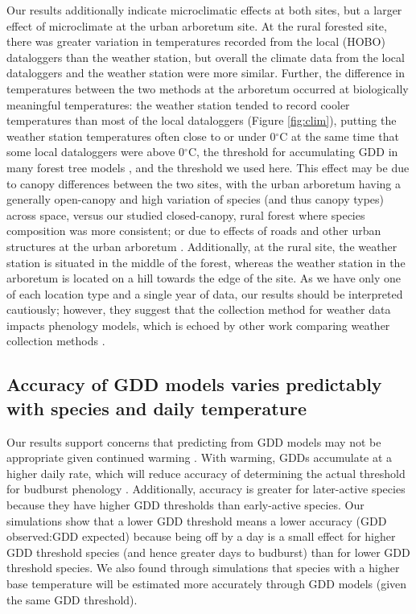 \documentclass{article}\usepackage[]{graphicx}\usepackage[]{color}
\begin{document}
Our results additionally indicate microclimatic effects at both sites, but a larger effect of microclimate at the urban arboretum site. At the rural forested site, there was greater variation in temperatures recorded from the local (HOBO) dataloggers than the weather station, but overall the climate data from the local dataloggers and the weather station were more similar. Further, the difference in temperatures between the two methods at the arboretum occurred at biologically meaningful temperatures: the weather station tended to record cooler temperatures than most of the local dataloggers (Figure \ref{fig:clim}), putting the weather station temperatures often close to or under 0$^{\circ}$C at the same time that some local dataloggers were above 0$^{\circ}$C, the threshold for accumulating GDD in many forest tree models \citep{Man2010}, and the threshold we used here. This effect may be due to canopy differences between the two sites, with the urban arboretum having a generally open-canopy and high variation of species (and thus canopy types) across space, versus our studied closed-canopy, rural forest where species composition was more consistent; or due to effects of roads and other urban structures at the urban arboretum \citep{Stabler2005,Erell2012,Dimoudi2013}. Additionally, at the rural site, the weather station is situated in the middle of the forest, whereas the weather station in the arboretum is located on a hill towards the edge of the site. As we have only one of each location type and a single year of data, our results should be interpreted cautiously; however, they suggest that the collection method for weather data impacts phenology models, which is echoed by other work comparing weather collection methods \citep[e.g.,][]{Laigle2021}.

\subsection{Accuracy of GDD models varies predictably with species and daily temperature} 
Our results support concerns that predicting from GDD models may not be appropriate given continued warming \citep{Man2010}. With warming, GDDs accumulate at a higher daily rate, which will reduce accuracy of determining the actual threshold for budburst phenology \citep{Bonhomme2000}. Additionally, accuracy is greater for later-active species because they have higher GDD thresholds than early-active species. Our simulations show that a lower GDD threshold means a lower accuracy (GDD observed:GDD expected) because being off by a day is a small effect for higher GDD threshold species (and hence greater days to budburst) than for lower GDD threshold species. We also found through simulations that species with a higher base temperature will be estimated more accurately through GDD models (given the same GDD threshold). 
\end{document}
